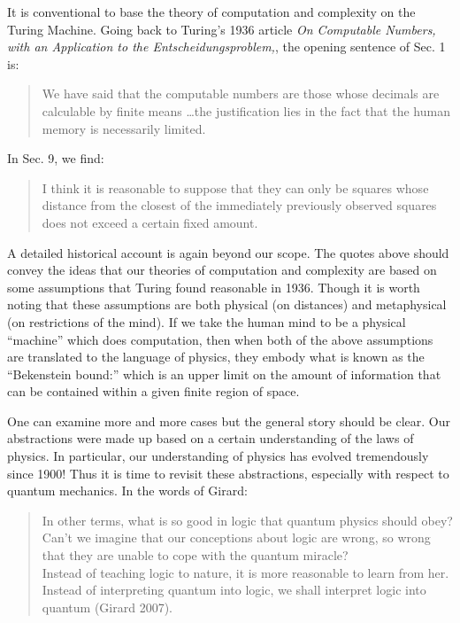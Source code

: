 \documentclass{article}
\begin{document}
It is conventional to base
the theory of computation and complexity on the Turing Machine.
Going back to Turing's 1936 article \emph{On Computable Numbers, with
  an Application to the Entscheidungsproblem,}, the opening sentence of
Sec. 1 is:
\begin{quote}
  We have said that the computable numbers are those whose decimals are
  calculable by finite means \ldots the justification lies in the fact that
  the human memory is necessarily limited.
\end{quote}
In Sec. 9, we find:
\begin{quote}
I think it is reasonable to suppose that they can only be squares
whose distance from the closest of the immediately previously observed
squares does not exceed a certain fixed amount.
\end{quote}
A detailed historical account is again beyond our scope. The quotes above
should convey the ideas that our theories
of computation and complexity are based on some assumptions that
Turing found reasonable in 1936. Though it is worth noting that these assumptions
are both physical (on distances) and metaphysical (on restrictions of the
mind).  If we take the human mind to be a physical ``machine'' which does
computation, then when both of the above assumptions are translated to the
language of physics, they embody what is known as the ``Bekenstein bound:''
which is an upper limit on the amount of information that can be contained
within a given finite region of space.

One can examine more and more cases but the general story should be
clear. Our abstractions were made up based on a certain understanding of the
laws of physics. In particular, our understanding of physics has evolved
tremendously since 1900!  Thus it is time to revisit these abstractions,
especially with respect to quantum mechanics.
In the words of Girard:
\begin{quote}
  In other terms, what is so good in logic that quantum physics should obey?
  Can't we imagine that our conceptions about logic are wrong, so wrong that
  they are unable to cope with the quantum miracle?
  \\
  Instead of teaching logic to nature, it is more reasonable to learn
  from her. Instead of interpreting quantum into logic, we shall
  interpret logic into quantum (Girard 2007).
\end{quote}
\end{document}
